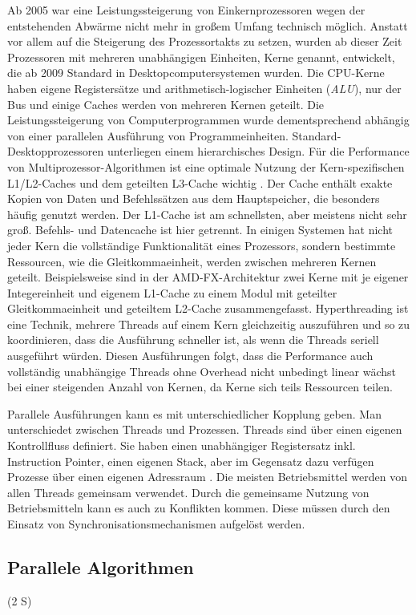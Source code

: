 \documentclass[a4paper,12pt,twoside]{article}
\newcommand{\Fb}[1]{\textit{#1}} %
\begin{document}
Ab 2005 war eine Leistungssteigerung von Einkernprozessoren wegen der entstehenden Abwärme nicht mehr in großem Umfang technisch möglich. Anstatt vor allem auf die Steigerung des Prozessortakts zu setzen, wurden ab dieser Zeit Prozessoren mit mehreren unabhängigen Einheiten, Kerne genannt, entwickelt, die ab 2009 Standard in Desktopcomputersystemen wurden. Die CPU-Kerne haben eigene Registersätze und arithmetisch-logischer Einheiten (\Fb{ALU}), nur der Bus und einige Caches werden von mehreren Kernen geteilt. Die Leistungssteigerung von Computerprogrammen wurde dementsprechend abhängig von einer parallelen Ausführung von Programmeinheiten. Standard-Desktopprozessoren unterliegen einem hierarchisches Design. Für die Performance von Multiprozessor-Algorithmen ist eine optimale Nutzung der Kern-spezifischen L1/L2-Caches und dem geteilten L3-Cache wichtig \parencite{Rauber2013}. Der Cache enthält exakte Kopien von Daten und Befehlssätzen aus dem Hauptspeicher, die besonders häufig genutzt werden. Der L1-Cache ist am schnellsten, aber meistens nicht sehr groß. Befehls- und Datencache ist hier getrennt. In einigen Systemen hat nicht jeder Kern die vollständige Funktionalität eines Prozessors, sondern bestimmte Ressourcen, wie die Gleitkommaeinheit, werden zwischen mehreren Kernen geteilt. Beispielsweise sind in der AMD-FX-Architektur zwei Kerne mit je eigener Integereinheit und eigenem L1-Cache zu einem Modul mit geteilter Gleitkommaeinheit und geteiltem L2-Cache zusammengefasst. Hyperthreading ist eine Technik, mehrere Threads auf einem Kern gleichzeitig auszuführen und so zu koordinieren, dass die Ausführung schneller ist, als wenn die Threads seriell ausgeführt würden. Diesen Ausführungen folgt, dass die Performance auch vollständig unabhängige Threads ohne Overhead nicht unbedingt linear wächst bei einer steigenden Anzahl von Kernen, da Kerne sich teils Ressourcen teilen.

Parallele Ausführungen kann es mit unterschiedlicher Kopplung geben. Man unterschiedet zwischen Threads und Prozessen. Threads sind über einen eigenen Kontrollfluss definiert. Sie haben einen unabhängiger Registersatz inkl. Instruction Pointer, einen eigenen Stack, aber im Gegensatz dazu verfügen Prozesse über einen eigenen Adressraum \parencite[S. 95]{Rauber2013}. Die meisten Betriebsmittel werden von allen Threads gemeinsam verwendet. Durch die gemeinsame Nutzung von Betriebsmitteln kann es auch zu Konflikten kommen. Diese müssen durch den Einsatz von Synchronisationsmechanismen aufgelöst werden.

\subsection{Parallele Algorithmen} (2 S)
\end{document}
